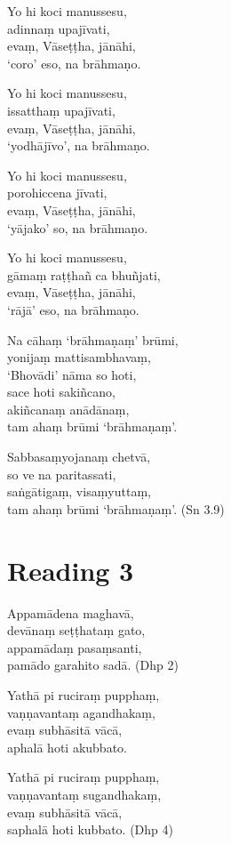 Yo hi koci manussesu,\\
adinnaṃ upajīvati,\\
evaṃ, Vāseṭṭha, jānāhi,\\
‘coro’ eso, na brāhmaṇo.

Yo hi koci manussesu,\\
issatthaṃ upajīvati,\\
evaṃ, Vāseṭṭha, jānāhi,\\
‘yodhājīvo’, na brāhmaṇo.

Yo hi koci manussesu,\\
porohiccena jīvati,\\
evaṃ, Vāseṭṭha, jānāhi,\\
‘yājako’ so, na brāhmaṇo.

Yo hi koci manussesu,\\
gāmaṃ raṭṭhañ ca bhuñjati,\\
evaṃ, Vāseṭṭha, jānāhi,\\
‘rājā’ eso, na brāhmaṇo.

Na cāhaṃ ‘brāhmaṇaṃ’ brūmi,\\
yonijaṃ mattisambhavaṃ,\\
‘Bhovādi’ nāma so hoti,\\
sace hoti sakiñcano,\\
akiñcanaṃ anādānaṃ,\\
tam ahaṃ brūmi ‘brāhmaṇaṃ’.

Sabbasaṃyojanaṃ chetvā,\\
so ve na paritassati,\\
saṅgātigaṃ, visaṃyuttaṃ,\\
tam ahaṃ brūmi ‘brāhmaṇaṃ’. (Sn 3.9)

\section*{Reading 3}

Appamādena maghavā,\\
devānaṃ seṭṭhataṃ gato,\\
appamādaṃ pasaṃsanti,\\
pamādo garahito sadā. (Dhp 2)

Yathā pi ruciraṃ pupphaṃ,\\
vaṇṇavantaṃ agandhakaṃ,\\
evaṃ subhāsitā vācā,\\
aphalā hoti akubbato.

Yathā pi ruciraṃ pupphaṃ,\\
vaṇṇavantaṃ sugandhakaṃ,\\
evaṃ subhāsitā vācā,\\
saphalā hoti kubbato. (Dhp 4)

